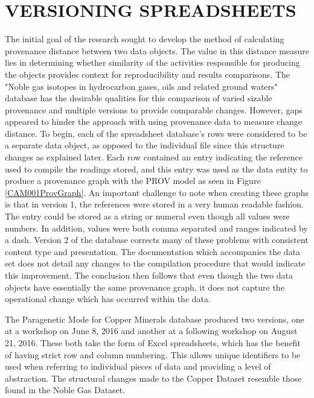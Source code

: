 
\chapter{VERSIONING SPREADSHEETS}\label{ch:spreadsheet}

The initial goal of the research sought to develop the method of calculating provenance distance between two data objects.  The value in this distance measure lies in determining whether similarity of the activities responsible for producing the objects provides context for reproducibility and results comparisons.  The "Noble gas isotopes in hydrocarbon gases, oils and related ground waters" database has the desirable qualities for this comparison of varied sizable provenance and multiple versions to provide comparable changes.  However, gaps appeared to hinder the approach with using provenance data to measure change distance. To begin, each of the spreadsheet database's rows were considered to be a separate data object, as opposed to the individual file since this structure changes as explained later.  Each row contained an entry indicating the reference used to compile the readings stored, and this entry was used as the data entity to produce a provenance graph with the PROV model as seen in Figure \ref{CAM001ProvGraph}.  An important challenge to note when creating these graphs is that in version 1, the references were stored in a very human readable fashion.  The entry could be stored as a string or numeral even though all values were numbers.  In addition, values were both comma separated and ranges indicated by a dash.  Version 2 of the database corrects many of these problems with consistent content type and presentation.  The documentation which accompanies the data set does not detail any changes to the compilation procedure that would indicate this improvement.  The conclusion then follows that even though the two data objects have essentially the same provenance graph, it does not capture the operational change which has occurred within the data.

The Paragenetic Mode for Copper Minerals database produced two versions, one at a workshop on June 8, 2016 and another at a following workshop on August 21, 2016.  These both take the form of Excel spreadsheets, which has the benefit of having strict row and column numbering. This allows unique identifiers to be used when referring to individual pieces of data and providing a level of abstraction.  The structural changes made to the Copper Dataset resemble those found in the Noble Gas Dataset.

